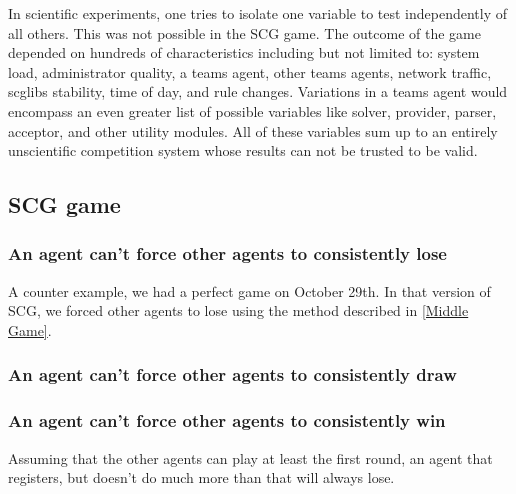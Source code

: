 \documentclass[letterpaper,12pt,oneside]{article}
\begin{document}
In scientific experiments, one tries to isolate one variable
to test independently of all others. This was not possible in the SCG game. The
outcome of the game depended on hundreds of characteristics including but not
limited to: system load, administrator quality, a teams agent, other teams
agents, network traffic, scglibs stability, time of day, and rule changes.
Variations in a teams agent would encompass an even greater list of possible
variables like solver, provider, parser, acceptor, and other utility modules.
All of these variables sum up to an entirely unscientific competition system
whose results can not be trusted to be valid.

\subsection{SCG game}

\subsubsection{An agent can't force other agents to consistently lose}

A counter example, we had a perfect game on October 29th. In that version
of SCG, we forced other agents to lose using the method described in
\ref{Middle Game}.

\subsubsection{An agent can't force other agents to consistently draw}
\subsubsection{An agent can't force other agents to consistently win}

Assuming that the other agents can play at least the first round, an agent
that registers, but doesn't do much more than that will always lose.


% 
%
{}

\end{document}
